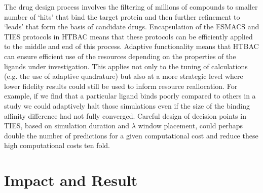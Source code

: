 \documentclass[conference]{IEEEtran}
\begin{document}

The drug design process involves the filtering of millions of compounds to  
smaller number of `hits' that bind the target protein and then further  
refinement to `leads' that form the basis of candidate drugs. Encapsulation of 
the ESMACS and TIES protocols in HTBAC means that these protocols can be 
efficiently applied to the middle and end of this process. Adaptive 
functionality means that HTBAC can ensure efficient use of the resources 
depending on the properties of the ligands under investigation. This applies 
not only to the tuning of calculations (e.g. the use of adaptive quadrature) 
but also at a more strategic level where lower fidelity results could still be 
used to inform resource reallocation. For example, if we find that a particular 
ligand binds poorly compared to others in a study we could adaptively halt those 
simulations even if the size of the binding affinity difference had not fully 
converged. Careful design of decision points in TIES, based on simulation 
duration and $\lambda$ window placement, could perhaps double the number of 
predictions for a given computational cost and reduce these high computational 
costs ten fold. 





\section{Impact and Result}\label{sec:demo}




\end{document}
